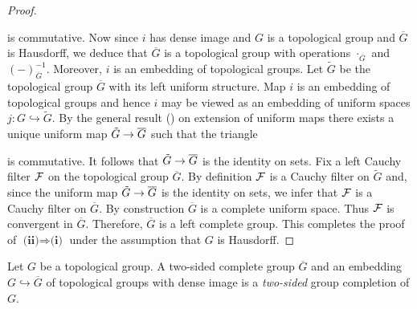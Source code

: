 \documentclass[10pt]{amsart}
\begin{document}
\begin{proof}
\begin{center}
	\end{center}
	is commutative. Now since $i$ has dense image and $G$ is a topological group and $\overline{G}$ is Hausdorff, we deduce that $\overline{G}$ is a topological group with operations $\cdot_{\overline{G}}$ and $(-)^{-1}_{\overline{G}}$. Moreover, $i$ is an embedding of topological groups. Let $\tilde{G}$ be the topological group $\overline{G}$ with its left uniform structure. Map $i$ is an embedding of topological groups and hence $i$ may be viewed as an embedding of uniform spaces $j:G\hookrightarrow \tilde{G}$. By the general result (\cite{Uniform_Spaces}) on extension of uniform maps there exists a unique uniform map $\tilde{G}\rightarrow \overline{G}$ such that the triangle
	\begin{center}
	\end{center}
	is commutative. It follows that $\tilde{G}\rightarrow \overline{G}$ is the identity on sets. Fix a left Cauchy filter ${\mathcal F}$ on the topological group $\overline{G}$. By definition ${\mathcal F}$ is a Cauchy filter on $\tilde{G}$ and, since the uniform map $\tilde{G}\rightarrow \overline{G}$ is the identity on sets, we infer that ${\mathcal F}$ is a Cauchy filter on $\overline{G}$. By construction $\overline{G}$ is a complete uniform space. Thus ${\mathcal F}$ is convergent in $\overline{G}$. Therefore, $\overline{G}$ is a left complete group. This completes the proof of $\textbf{(ii)}\Rightarrow \textbf{(i)}$ under the assumption that $G$ is Hausdorff.
\end{proof}


\begin{definition}
	Let $G$ be a topological group. A two-sided complete group $\overline{G}$ and an embedding $G \hookrightarrow \overline{G}$ of topological groups with dense image is a \textit{two-sided} group completion of $G$.
\end{definition}
\end{document}
